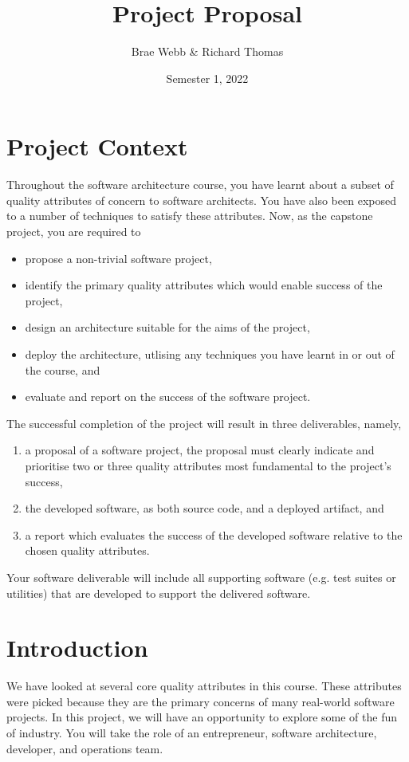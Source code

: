 \documentclass{csse4400}
\title{Project Proposal}
\author{Brae Webb \& Richard Thomas}
\date{Semester 1, 2022}
\begin{document}
\maketitle

\section*{Project Context}
Throughout the software architecture course,
you have learnt about a subset of quality attributes of concern to software architects.
You have also been exposed to a number of techniques to satisfy these attributes.
Now, as the capstone project, you are required to
\begin{itemize}
    \item propose a non-trivial software project,
    \item identify the primary quality attributes which would enable success of the project,
    \item design an architecture suitable for the aims of the project,
    \item deploy the architecture, utlising any techniques you have learnt in or out of the course, and
    \item evaluate and report on the success of the software project.
\end{itemize}

\noindent
The successful completion of the project will result in three deliverables, namely,
\begin{enumerate}[label=\roman*]
    \item a proposal of a software project, the proposal must clearly indicate and prioritise two or three quality attributes most {\color{red} fundamental} to the project's success,
    \item the developed software,	 as both source code, and a deployed artifact, and
    \item a report which evaluates the success of the developed software relative to the chosen quality attributes.
\end{enumerate}

\noindent
Your software deliverable will include all supporting software (e.g. test suites or utilities) that are developed to support the delivered software.

\section{Introduction}
We have looked at several core quality attributes in this course.
These attributes were picked because they are the primary concerns of many real-world software projects.
In this project, we will have an opportunity to explore some of the fun of industry.
You will take the role of an entrepreneur, software architecture, developer, and operations team.
\end{document}
